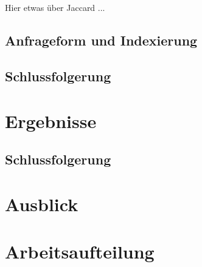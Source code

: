 \documentclass{scrartcl}
\begin{document}
\\
\\
Hier etwas über Jaccard ... 

\subsection{Anfrageform und Indexierung}

\subsection{Schlussfolgerung}



\section{Ergebnisse}

\subsection{Schlussfolgerung}

\FloatBarrier

\section{Ausblick}

\section{Arbeitsaufteilung}
\end{document}
